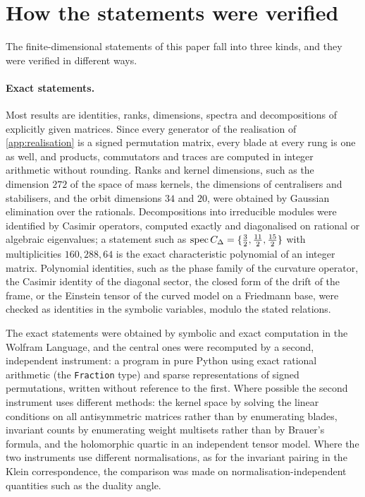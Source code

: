 \section{How the statements were verified}
\label{app:methods}

The finite-dimensional statements of this paper fall into three kinds, and they were verified in different ways.

\paragraph{Exact statements.} Most results are identities, ranks, dimensions, spectra and decompositions of explicitly given matrices. Since every generator of the
realisation of \cref{app:realisation} is a signed permutation matrix, every blade at every rung is one as well, and products, commutators and traces are computed in integer
arithmetic without rounding. Ranks and kernel dimensions, such as the dimension $272$ of the space of mass kernels, the dimensions of centralisers and stabilisers, and the
orbit dimensions $34$ and $20$, were obtained by Gaussian elimination over the rationals. Decompositions into irreducible modules were identified by Casimir operators,
computed exactly and diagonalised on rational or algebraic eigenvalues; a statement such as $\operatorname{spec} C_\Delta=\{\tfrac32,\tfrac{11}2,\tfrac{15}2\}$ with multiplicities
$160,288,64$ is the exact characteristic polynomial of an integer matrix. Polynomial identities, such as the phase family of the curvature operator, the Casimir identity of the
diagonal sector, the closed form of the drift of the frame, or the Einstein tensor of the curved model on a Friedmann base, were checked as identities in the symbolic
variables, modulo the stated relations.

The exact statements were obtained by symbolic and exact computation in the Wolfram Language, and the central ones were recomputed by a second,
independent instrument: a program in pure Python using exact rational arithmetic (the \texttt{Fraction} type) and sparse representations of signed permutations, written
without reference to the first. Where possible the second instrument uses different methods: the kernel space by solving the linear conditions on all antisymmetric matrices rather than by
enumerating blades, invariant counts by enumerating weight multisets rather than by Brauer's formula, and the holomorphic quartic in an independent tensor model. Where the two
instruments use different normalisations, as for the invariant pairing in the Klein correspondence, the comparison was made on normalisation-independent quantities such as the
duality angle.

